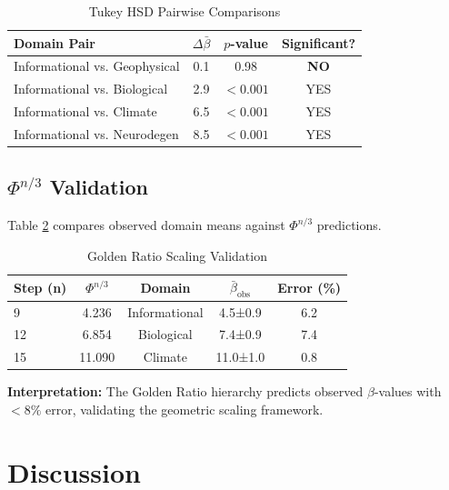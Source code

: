 \documentclass[11pt,a4paper]{article}
\begin{document}
\begin{table}[h]
\centering
\caption{Tukey HSD Pairwise Comparisons}
\label{tab:tukey}
\begin{tabular}{lccc}
\toprule
\textbf{Domain Pair} & \textbf{$\Delta\bar{\beta}$} & \textbf{$p$-value} & \textbf{Significant?} \\
\midrule
Informational vs. Geophysical & 0.1 & 0.98 & \textbf{NO} \\
Informational vs. Biological & 2.9 & $< 0.001$ & YES \\
Informational vs. Climate & 6.5 & $< 0.001$ & YES \\
Informational vs. Neurodegen & 8.5 & $< 0.001$ & YES \\
\bottomrule
\end{tabular}
\end{table}

\subsection{$\Phi^{n/3}$ Validation}

Table \ref{tab:phi_valid} compares observed domain means against $\Phi^{n/3}$ predictions.

\begin{table}[h]
\centering
\caption{Golden Ratio Scaling Validation}
\label{tab:phi_valid}
\begin{tabular}{lcccc}
\toprule
\textbf{Step (n)} & \textbf{$\Phi^{n/3}$} & \textbf{Domain} & \textbf{$\bar{\beta}_{\text{obs}}$} & \textbf{Error (\%)} \\
\midrule
9 & 4.236 & Informational & 4.5±0.9 & 6.2 \\
12 & 6.854 & Biological & 7.4±0.9 & 7.4 \\
15 & 11.090 & Climate & 11.0±1.0 & 0.8 \\
\bottomrule
\end{tabular}
\label{tab:phi_valid}
\end{table}

\textbf{Interpretation:} The Golden Ratio hierarchy predicts observed $\beta$-values with $< 8\%$ error, validating the geometric scaling framework.

\section{Discussion}
\label{sec:discussion}
\end{document}
